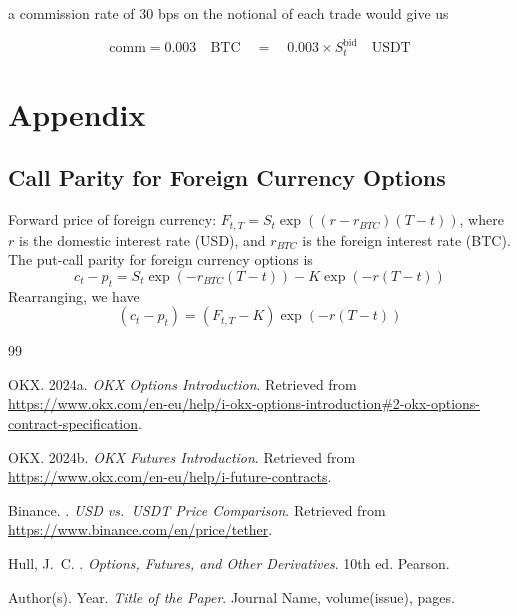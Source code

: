\documentclass[12pt]{article}
\begin{document}
a commission rate of 30 bps on the notional of each trade would give us

\begin{equation}
\text{comm} = 0.003 \quad \text{BTC} \quad = \quad 0.003 \times S_t^\text{bid} \quad \text{USDT}
\end{equation}




\section{Appendix}

\subsection{ Call Parity for Foreign Currency Options}

Forward price of foreign currency: $F_{t,T} = S_t \exp\left((r - r_{BTC})(T-t)\right)$, where $r$ is the domestic interest rate (USD), and $r_{BTC}$ is the foreign interest rate (BTC). The put-call parity for foreign currency options is
\begin{equation}
c_t - p_t = S_t \exp\left(-r_{BTC}(T-t)\right) - K \exp\left(-r(T-t)\right)
\end{equation}
Rearranging, we have
\begin{equation}(c_t - p_t) = (F_{t,T} - K)\exp\left(-r(T-t)\right)
\end{equation}\citet{Hull}

\begin{thebibliography}{99}

OKX.
\newblock 2024a.
\newblock \textit{OKX Options Introduction}.
\newblock Retrieved from
\url{https://www.okx.com/en-eu/help/i-okx-options-introduction\#2-okx-options-contract-specification}.

OKX.
\newblock 2024b.
\newblock \textit{OKX Futures Introduction}.
\newblock Retrieved from
\url{https://www.okx.com/en-eu/help/i-future-contracts}.

Binance.
.
\newblock \textit{USD vs.\ USDT Price Comparison}.
\newblock Retrieved from
\url{https://www.binance.com/en/price/tether}.

Hull, J.~C.
.
\newblock \textit{Options, Futures, and Other Derivatives}.
\newblock 10th ed.
\newblock Pearson.

Author(s).
\newblock Year.
\newblock \textit{Title of the Paper}.
\newblock Journal Name, volume(issue), pages.

\end{thebibliography}
\end{document}
